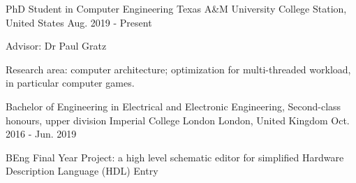 
\begin{cventries}
\cventry
    {PhD Student in Computer Engineering} %
    {Texas A\&M University} %
    {College Station, United States} %
    {Aug. 2019 - Present} %
    {
      \begin{cvitems} %
         \item {Advisor: Dr Paul Gratz}
         \item {Research area: computer architecture; optimization for multi-threaded workload, in particular computer games.}
      \end{cvitems}
    }
  \cventry
    {Bachelor of Engineering in Electrical and Electronic Engineering, Second-class honours, upper division} %
    {Imperial College London} %
    {London, United Kingdom} %
    {Oct. 2016 - Jun. 2019} %
    {
      \begin{cvitems} %
         \item {BEng Final Year Project: a high level schematic editor for simplified Hardware Description Language (HDL) Entry}
      \end{cvitems}
    }
\end{cventries}
